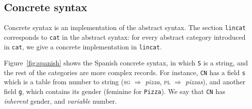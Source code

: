 \documentclass[11pt]{article}
\def\t#1{\texttt{#1}}
\begin{document}
\subsection{Concrete syntax}
Concrete syntax is an implementation of the abstract syntax.
The section \t{lincat} corresponds to \t{cat} in the abstract syntax:
for every abstract category introduced in \t{cat}, we give a concrete implementation in \t{lincat}.


Figure~\ref{fig:spanish} shows the Spanish concrete
syntax, in which \t{S} is a string, and the rest of the
categories are more complex records. For instance, \t{CN} has a field \t{s} which
is a table from number to string (\textsc{sg} $\Rightarrow$
\emph{pizza}, \textsc{pl} $\Rightarrow$ \emph{pizzas}), and another field \t{g}, which contains its gender
(feminine for \t{Pizza}). We say that \t{CN} has \emph{inherent} gender,
and \emph{variable} number.
\end{document}
